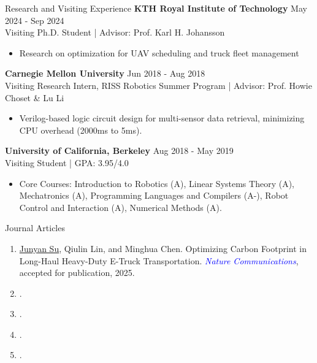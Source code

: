 \documentclass{resume} %
\begin{document}
\begin{rSection}{Research and Visiting Experience}
    \textbf{KTH Royal Institute of Technology} \hfill {May 2024 - Sep 2024}
    \\ Visiting Ph.D. Student | Advisor: Prof. Karl H. Johansson
    \begin{itemize}
    \item Research on optimization for UAV scheduling and truck fleet management
    \end{itemize}
    
    \textbf{Carnegie Mellon University} \hfill {Jun 2018 - Aug 2018}
    \\ Visiting Research Intern, RISS Robotics Summer Program | Advisor: Prof. Howie Choset \& Lu Li
    \begin{itemize}
    \item Verilog-based logic circuit design for multi-sensor data retrieval, minimizing CPU overhead (2000ms to 5ms).
    \end{itemize}
    \textbf{University of California, Berkeley} \hfill {Aug 2018 - May 2019}
    \\ Visiting Student | GPA: 3.95/4.0
    \begin{itemize}
    \item Core Courses: Introduction to Robotics (A), Linear Systems Theory (A), Mechatronics (A), Programming Languages and Compilers (A-), Robot Control and Interaction (A), Numerical Methods (A).
    \end{itemize}
\end{rSection}


\def\FormatName#1{%
    \def\myname{Junyan Su}%
    \edef\name{#1}%
    \ifx\name\myname
      \underline{#1}%
    \else
       #1%
    \fi
}

\begin{rSection}{Journal Articles}
    \begin{enumerate}
        \item \underline{Junyan Su}, Qiulin Lin, and Minghua Chen. Optimizing Carbon Footprint in Long-Haul Heavy-Duty E-Truck Transportation. \textcolor{blue}{\emph{Nature Communications}}, accepted for publication, 2025. 
        \item {}.
        \item {}.
        \item {}.
        \item {}.
    \end{enumerate}
\end{rSection}
\end{document}
